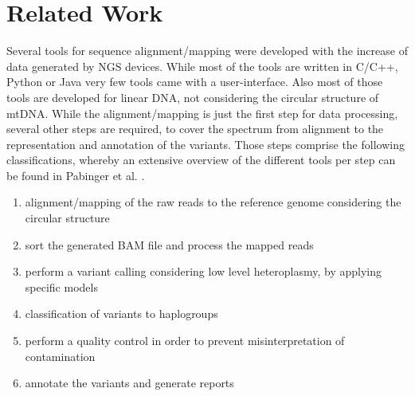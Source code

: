 \section{Related Work}
Several tools for sequence alignment/mapping were developed with the increase of data generated by NGS devices. While most of the tools are written in C/C++, Python or Java very few tools came with a user-interface. Also most of those tools are developed for linear DNA, not considering the circular structure of mtDNA. While the alignment/mapping is just the first step for data processing, several other steps are required, to cover the spectrum from alignment to the representation and annotation of the variants. Those steps comprise the following classifications, whereby an extensive overview of the different tools per step can be found in Pabinger et al. {\cite{Pabinger2013}}. 
\begin{enumerate}\label{enum:NGS}
\item alignment/mapping of the raw reads to the reference genome considering the circular structure
\item sort the generated BAM file and process the mapped reads
\item perform a variant calling considering low level heteroplasmy, by applying specific models
\item classification of variants to haplogroups
\item perform a quality control in order to prevent misinterpretation of contamination 
\item annotate the variants and generate reports
\end{enumerate}

